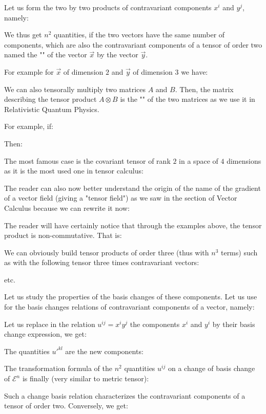 	Let us form the two by two products of contravariant components $x^i$ and $y^j$, namely:
	
	We thus get $n^2$ quantities, if the two vectors have the same number of components, which are also the contravariant components of a tensor of order two named the "" of the vector $\vec{x}$ by the vector $\vec{y}$.
	
	For example for $\vec{x}$ of dimension $2$ and $\vec{y}$ of dimension $3$ we have:
	
	We can also tensorally multiply two matrices $A$ and $B$. Then, the matrix describing the tensor product $A\otimes B$ is the "\label{kronecker product}" of the two matrices as we use it in Relativistic Quantum Physics.
	
	For example, if:
	
	Then:
	
	The most famous case is the covariant tensor of rank $2$ in a space of $4$ dimensions as it is the most used one in tensor calculus:
	
	The reader can also now better understand the origin of the name of the gradient of a vector field (giving a "tensor field") as we saw in the section of Vector Calculus because we can rewrite it now:
	
	 The reader will have certainly notice that through the examples above, the tensor product is non-commutative. That is:
	
	We can obviously build tensor products of order three (thus with $n^3$ terms) such as with the following tensor three times  contravariant vectors:
	
	etc.

	Let us study the properties of the basis changes of these components. Let us use for the basis changes relations of contravariant components of a vector, namely:
	
	Let us replace in the relation $u^{ij}=x^iy^j$ the components $x^i$ and $y^i$ by their basis change expression, we get:
	
	The quantities ${u'}^{kl}$ are the new components:
	
	The transformation formula of the $n^2$ quantities $u^{ij}$ on a change of basis change of $\mathcal{E}^n$ is finally (very similar to metric tensor):
	
	Such a change basis relation characterizes the contravariant components of a tensor of order two. Conversely, we get:
	
